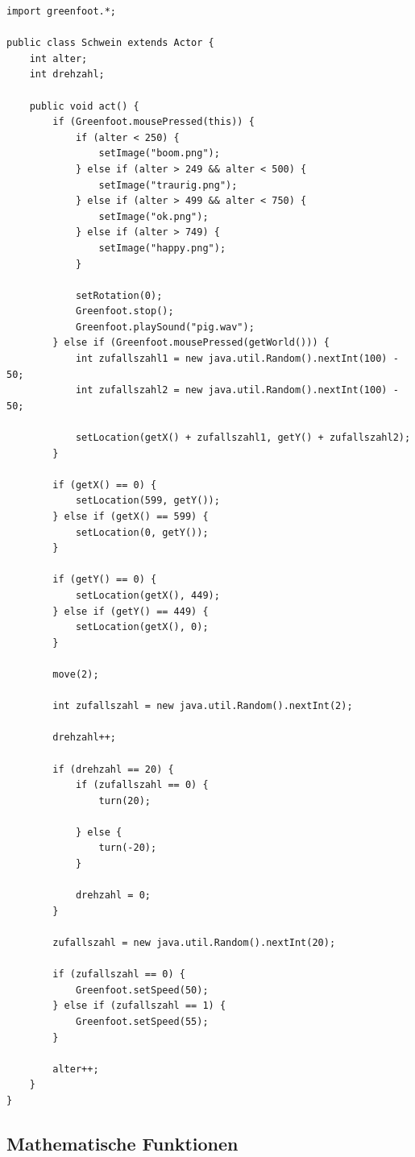 \documentclass{scrartcl}   %
\begin{document}
\begin{lstlisting}
import greenfoot.*;

public class Schwein extends Actor {
    int alter;
    int drehzahl;

    public void act() {
        if (Greenfoot.mousePressed(this)) {
            if (alter < 250) {
                setImage("boom.png");
            } else if (alter > 249 && alter < 500) {
                setImage("traurig.png");
            } else if (alter > 499 && alter < 750) {
                setImage("ok.png");
            } else if (alter > 749) {
                setImage("happy.png");
            }

            setRotation(0);
            Greenfoot.stop();
            Greenfoot.playSound("pig.wav");
        } else if (Greenfoot.mousePressed(getWorld())) {
            int zufallszahl1 = new java.util.Random().nextInt(100) - 50;
            int zufallszahl2 = new java.util.Random().nextInt(100) - 50;
            
            setLocation(getX() + zufallszahl1, getY() + zufallszahl2);
        }

        if (getX() == 0) {
            setLocation(599, getY());
        } else if (getX() == 599) {
            setLocation(0, getY());
        }

        if (getY() == 0) {
            setLocation(getX(), 449);
        } else if (getY() == 449) {
            setLocation(getX(), 0);
        }

        move(2);

        int zufallszahl = new java.util.Random().nextInt(2);

        drehzahl++;

        if (drehzahl == 20) {
            if (zufallszahl == 0) {
                turn(20);
                
            } else {
                turn(-20);
            }

            drehzahl = 0;
        }

        zufallszahl = new java.util.Random().nextInt(20);

        if (zufallszahl == 0) {
            Greenfoot.setSpeed(50);
        } else if (zufallszahl == 1) {
            Greenfoot.setSpeed(55);
        }

        alter++;
    }
}
\end{lstlisting}

\subsection{Mathematische Funktionen}
\end{document}

